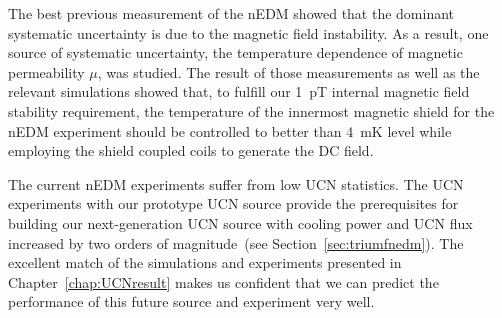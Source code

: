 The best previous measurement of the nEDM showed that the dominant
systematic uncertainty is due to the magnetic field instability. As a
result, one source of systematic uncertainty, the temperature
dependence of magnetic permeability $\mu$, was studied. The result of
those measurements as well as the relevant simulations showed that, to
fulfill our 1~pT internal magnetic field stability requirement, the
temperature of the innermost magnetic shield for the nEDM experiment
should be controlled to better than 4~mK level while employing the
shield coupled coils to generate the DC field.

The current nEDM experiments suffer from low UCN statistics. The UCN
experiments with our prototype UCN source provide the prerequisites
for building our next-generation UCN source with cooling power and UCN
flux increased by two orders of magnitude~(see
Section~\ref{sec:triumfnedm}). The excellent match of the simulations
and experiments presented in Chapter~\ref{chap:UCNresult} makes us
confident that we can predict the performance of this future source
and experiment very well.












